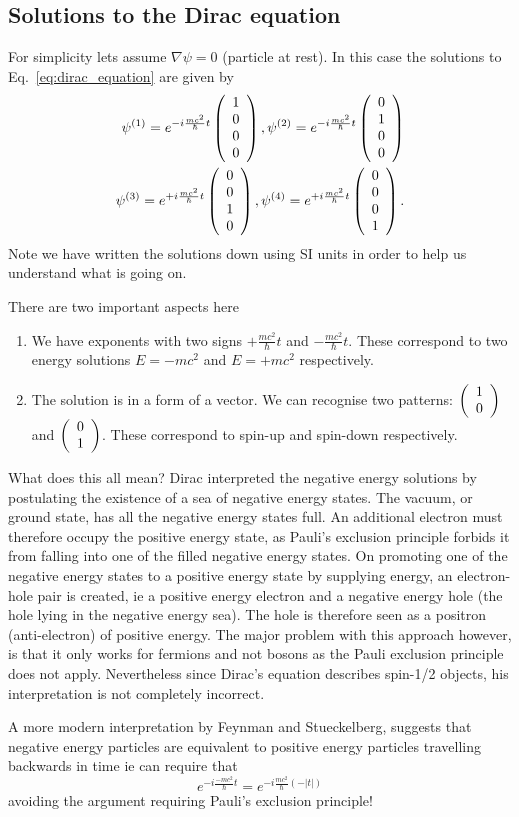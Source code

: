 \subsection{Solutions to the Dirac equation}
For simplicity lets assume $\nabla\psi=0$ (particle at rest). In this case the solutions to Eq.~\ref{eq:dirac_equation} are given by
\begin{eqnarray}
\psi^{(1)}=e^{-i\frac{mc^2}{\hbar}t} \left( \begin{array}{c} 1 \\ 0 \\ 0 \\ 0\end{array} \right),
\psi^{(2)}=e^{-i\frac{mc^2}{\hbar}t} \left( \begin{array}{c} 0 \\ 1 \\ 0 \\ 0\end{array} \right)\\
\psi^{(3)}=e^{+i\frac{mc^2}{\hbar}t} \left( \begin{array}{c} 0 \\ 0 \\ 1 \\ 0\end{array} \right),
\psi^{(4)}=e^{+i\frac{mc^2}{\hbar}t} \left( \begin{array}{c} 0 \\ 0 \\ 0 \\ 1\end{array} \right).
\end{eqnarray}
Note we have written the solutions down using SI units in order to help us understand what is going on.

There are two important aspects here
\begin{enumerate}
\item We have exponents with two signs $+\frac{mc^2}{\hbar}t$ and $-\frac{mc^2}{\hbar}t$. These correspond to two energy solutions $E=-mc^2$ and $E=+mc^2$ respectively.
\item The solution is in a form of a vector. We can recognise two patterns: $ \left( \begin{array}{c} 1 \\ 0 \end{array} \right)$ and $ \left( \begin{array}{c} 0 \\ 1 \end{array} \right)$. These correspond to spin-up and spin-down respectively.
\end{enumerate}
What does this all mean? Dirac interpreted the negative energy solutions by postulating the existence of a sea of negative energy states. The vacuum, or ground state, has all the negative energy states full. An additional electron must therefore occupy the positive energy state, as Pauli's exclusion principle forbids it from falling into one of the filled negative energy states. On promoting one of the negative energy states to a positive energy state by supplying energy, an electron-hole pair is created, ie a positive energy electron and a negative energy hole (the hole lying in the negative energy sea). The hole is therefore seen as a positron (anti-electron) of positive energy. The major problem with this approach however, is that it only works for fermions and not bosons as the Pauli exclusion principle does not apply. Nevertheless since Dirac's equation describes spin-1/2 objects, his interpretation is not completely incorrect. 

A more modern interpretation by Feynman and Stueckelberg, suggests that negative energy particles are equivalent to positive energy particles travelling backwards in time ie can require that 
\[
e^{-i\frac{-mc^2}{\hbar}t}=e^{-i\frac{mc^2}{\hbar}(-|t|)}
\]
avoiding the argument requiring Pauli's exclusion principle!

